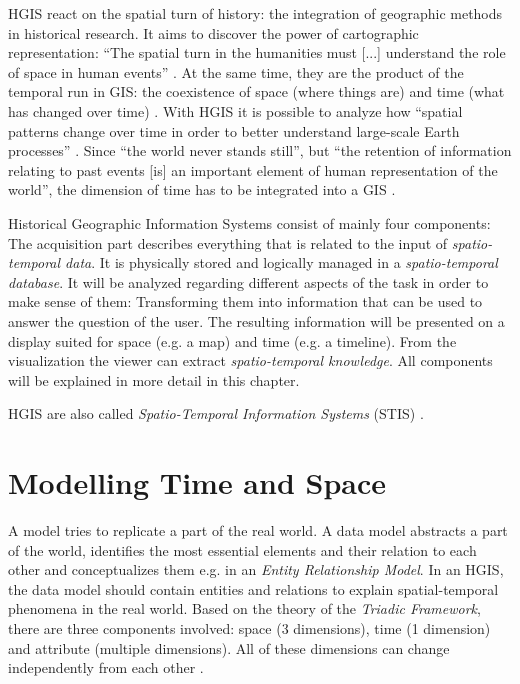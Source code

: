 HGIS react on the spatial turn of history: the integration of geographic methods in historical research. It aims to discover the power of cartographic representation: ``The spatial turn in the humanities must [...] understand the role of space in human events''
\cite{bodenhamer2010spatial}.
At the same time, they are the product of the temporal run in GIS: the coexistence of space (where things are) and time (what has changed over time)
\cite[p. 45]{solana2014spatio}.
With HGIS it is possible to analyze how ``spatial patterns change over time in order to better understand large-scale Earth processes''
\cite{peuquet99}.
Since ``the world never stands still'', but ``the retention of information relating to past events [is] an important element of human representation of the world'', the dimension of time has to be integrated into a GIS
\cite{peuquet99}.

Historical Geographic Information Systems consist of mainly four components: The acquisition part describes everything that is related to the input of \emph{spatio-temporal data}. It is physically stored and logically managed in a \emph{spatio-temporal database}. It will be analyzed regarding different aspects of the task in order to make sense of them: Transforming them into information that can be used to answer the question of the user. The resulting information will be presented on a display suited for space (e.g. a map) and time (e.g. a timeline). From the visualization the viewer can extract \emph{spatio-temporal knowledge}. All components will be explained in more detail in this chapter.

HGIS are also called \emph{Spatio-Temporal Information Systems} (STIS)
\cite{pelekis04stdms}.




\section{Modelling Time and Space} %
\label{sec:modelling_time_and_space}

A model tries to replicate a part of the real world. A data model abstracts a part of the world, identifies the most essential elements and their relation to each other and conceptualizes them e.g. in an \emph{Entity Relationship Model}. In an HGIS, the data model should contain entities and relations to explain spatial-temporal phenomena in the real world. Based on the theory of the \emph{Triadic Framework}, there are three components involved: space (3 dimensions), time (1 dimension) and attribute (multiple dimensions). All of these dimensions can change independently from each other
\cite[p. 53]{ott2001time}.

